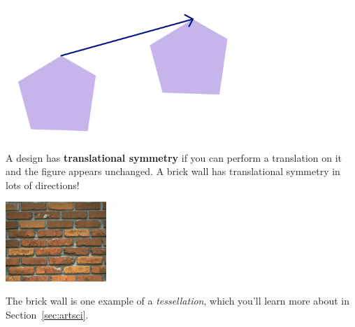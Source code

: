 \documentclass[12pt, reqno]{amsart}
\theoremstyle{remark}
\theoremstyle{definition}
\numberwithin{equation}{section}  %
\begin{document}
\begin{center}
\includegraphics[height=5cm]{vectrans}
\end{center}

A design has {\bf translational symmetry} if you can perform a translation on it and the figure appears unchanged.  A brick wall has translational symmetry in lots of directions!

\begin{center}\label{pic:trans1}
\includegraphics[height=3cm]{brickwall}
\end{center}
The brick wall is one example of a \emph{tessellation}, which you'll learn more about in Section~\ref{sec:artsci}.
\end{document}
